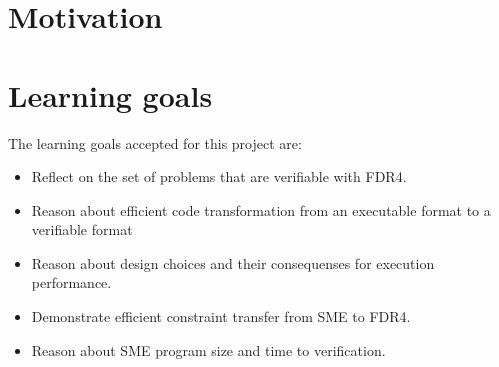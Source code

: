 \documentclass[a4paper]{report}
\begin{document}
\section{Motivation}
\section{Learning goals}
The learning goals accepted for this project are:
\begin{itemize}
\item Reflect on the set of problems that are verifiable with FDR4.
\item Reason about efficient code transformation from an executable format to a verifiable format
\item Reason about design choices and their consequenses for execution performance.
\item Demonstrate efficient constraint transfer from SME to FDR4.
\item Reason about SME program size and time to verification. 
\end{itemize}
\end{document}

